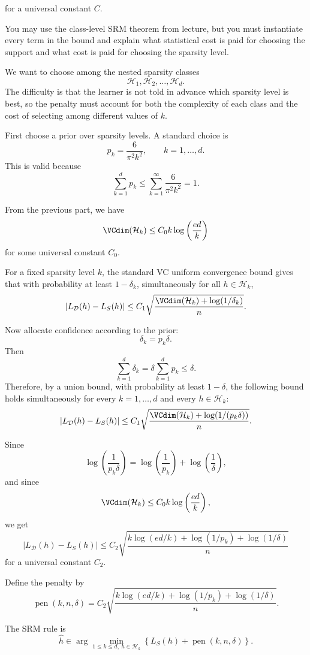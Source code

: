 \documentclass[11pt]{article}
\newcommand{\calD}{\mathcal{D}}
\newcommand{\calH}{\mathcal{H}}
\begin{document}
for a universal constant $C$.

You may use the class-level SRM theorem from lecture, but you must
instantiate every term in the bound and explain what statistical cost is
paid for choosing the support and what cost is paid for choosing the
sparsity level.


\begin{solutionbox}

We want to choose among the nested sparsity classes
\[
\calH_1,\calH_2,\dots,\calH_d.
\]
The difficulty is that the learner is not told in advance which sparsity level is best, so the penalty must account for both the complexity of each class and the cost of selecting among different values of $k$.

\medskip

First choose a prior over sparsity levels. A standard choice is
\[
p_k=\frac{6}{\pi^2 k^2}, \qquad k=1,\dots,d.
\]
This is valid because
\[
\sum_{k=1}^d p_k
\le
\sum_{k=1}^{\infty}\frac{6}{\pi^2 k^2}
=
1.
\]

From the previous part, we have
\[
\VCdim(\calH_k)
\le
C_0 k\log\left(\frac{ed}{k}\right)
\]
for some universal constant $C_0$.

For a fixed sparsity level $k$, the standard VC uniform convergence bound gives that with probability at least $1-\delta_k$, simultaneously for all $h\in\calH_k$,
\[
|L_{\calD}(h)-L_S(h)|
\le
C_1
\sqrt{
\frac{
\VCdim(\calH_k)+\log(1/\delta_k)
}{n}
}.
\]

Now allocate confidence according to the prior:
\[
\delta_k=p_k\delta.
\]
Then
\[
\sum_{k=1}^d \delta_k
=
\delta\sum_{k=1}^d p_k
\le
\delta.
\]
Therefore, by a union bound, with probability at least $1-\delta$, the following bound holds simultaneously for every $k=1,\dots,d$ and every $h\in\calH_k$:
\[
|L_{\calD}(h)-L_S(h)|
\le
C_1
\sqrt{
\frac{
\VCdim(\calH_k)+\log(1/(p_k\delta))
}{n}
}.
\]

Since
\[
\log\left(\frac{1}{p_k\delta}\right)
=
\log\left(\frac{1}{p_k}\right)
+
\log\left(\frac{1}{\delta}\right),
\]
and since
\[
\VCdim(\calH_k)
\le
C_0 k\log\left(\frac{ed}{k}\right),
\]
we get
\[
|L_{\calD}(h)-L_S(h)|
\le
C_2
\sqrt{
\frac{
k\log(ed/k)+\log(1/p_k)+\log(1/\delta)
}{n}
}
\]
for a universal constant $C_2$.

Define the penalty by
\[
\operatorname{pen}(k,n,\delta)
=
C_2
\sqrt{
\frac{
k\log(ed/k)+\log(1/p_k)+\log(1/\delta)
}{n}
}.
\]

The SRM rule is
\[
\hat h\in
\arg\min_{1\le k\le d,\ h\in\calH_k}
\left\{
L_S(h)+\operatorname{pen}(k,n,\delta)
\right\}.
\]


\end{solutionbox}
\end{document}
